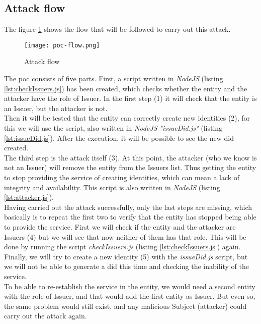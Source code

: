 \subsection{Attack flow}
The figure \ref{fig:poc-flow} shows the flow that will be followed to carry out this attack.
\begin{figure}[h]
    \centering
    \texttt{[image: poc-flow.png]}
    \caption{Attack flow}
    \label{fig:poc-flow}
\end{figure}

The \acrshort{poc} consists of five parts. First, a script written in \textit{NodeJS} (listing \ref{lst:checkIssuers.js}) has been created, which checks whether the entity and the attacker have the role of Issuer. In the first step (1) it will check that the entity is an Issuer, but the attacker is not.\\


Then it will be tested that the entity can correctly create new identities (2), for this we will use the script, also written in \textit{NodeJS} \textit{"issueDid.js"} (listing \ref{lst:issueDid.js}). After the execution, it will be possible to see the new \acrshort{did} created.\\


The third step is the attack itself (3). At this point, the attacker (who we know is not an Issuer) will remove the entity from the Issuers list. Thus getting the entity to stop providing the service of creating identities, which can mean a lack of integrity and availability. This script is also written in \textit{NodeJS} (listing \ref{lst:attacker.js}).\\


Having carried out the attack successfully, only the last steps are missing, which basically is to repeat the first two to verify that the entity has stopped being able to provide the service. First we will check if the entity and the attacker are Issuers (4) but we will see that now neither of them has that role. This will be done by running the script \textit{checkIssuers.js} (listing \ref{lst:checkIssuers.js}) again. \\

Finally, we will try to create a new identity (5) with the \textit{issueDid.js} script, but we will not be able to generate a \acrshort{did} this time and checking the inability of the service.\\

To be able to re-establish the service in the entity, we would need a second entity with the role of Issuer, and that would add the first entity as Issuer. But even so, the same problem would still exist, and any malicious Subject (attacker) could carry out the attack again.

